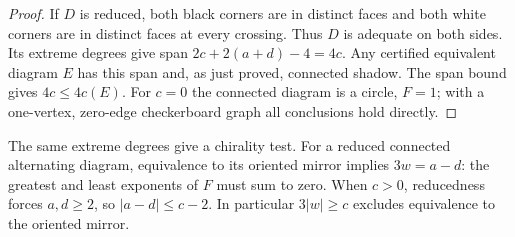 \begin{proof}
If $D$ is reduced, both black corners are in distinct faces and both white
corners are in distinct faces at every crossing. Thus $D$ is adequate on
both sides. Its extreme degrees give span $2c+2(a+d)-4=4c$.
Any certified equivalent diagram $E$ has this span and, as just proved,
connected shadow. The span bound gives $4c\le4c(E)$. For $c=0$ the
connected diagram is a circle, $F=1$; with a one-vertex, zero-edge
checkerboard graph all conclusions hold directly.
\end{proof}

The same extreme degrees give a chirality test. For a reduced connected
alternating diagram, equivalence to its oriented mirror implies
$3w=a-d$: the greatest and least exponents of $F$ must sum to zero.
When $c>0$, reducedness forces $a,d\ge2$, so $|a-d|\le c-2$.
In particular $3|w|\ge c$ excludes equivalence to the oriented mirror.

